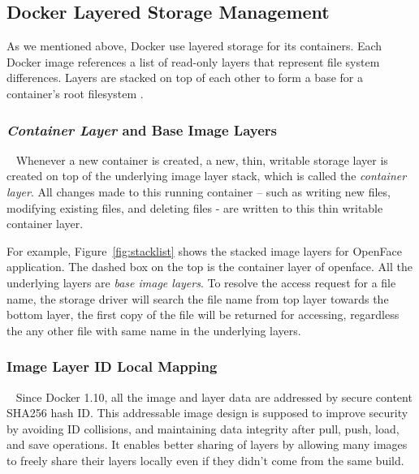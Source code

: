 

\subsection{Docker Layered Storage Management}\label{aufsIntroduction}

As we mentioned above, Docker use layered storage for its containers. Each Docker image references a list of read-only layers that represent file system differences. Layers are stacked on top of each other to form a base for a container’s root filesystem \cite{dockerlayer}. 

\smallbreak
\subsubsection{\textit{Container Layer} and Base Image Layers}
~\smallbreak
Whenever a new container is created, a new, thin, writable storage layer is created on top of the underlying image layer stack, which is called the \textit{container layer}. All changes made to this running container -- such as writing new files, modifying existing files, and deleting files - are written to this thin writable container layer\cite{dockerlayer}.

For example, 
Figure~\ref{fig:stacklist} shows the stacked image layers for OpenFace application. The dashed box on the top is the container layer of openface. All the underlying layers are \textit{base image layers}. To resolve the access request for a file name, the storage driver will search the file name from top layer towards the bottom layer, the first copy of the file will be returned for accessing, regardless the any other file with same name in the underlying layers.




\smallbreak
\subsubsection{Image Layer ID Local Mapping}
~\smallbreak
Since Docker 1.10, all the image and layer data are addressed by secure content SHA256 hash ID. 
This addressable image design is supposed to improve security by avoiding ID collisions, and maintaining data integrity after pull, push, load, and save operations. It enables better sharing of layers by allowing many images to freely share their layers locally even if they didn’t come from the same build\cite{dockerlayer}. 

